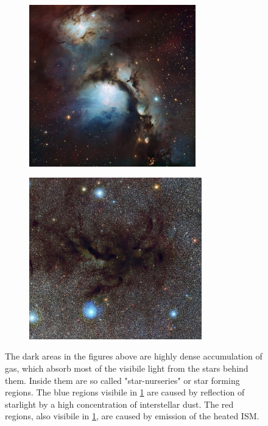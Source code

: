 \begin{figure}[h]
	\begin{subfigure}[c]{0.45\textwidth}
		\includegraphics[height=7cm]{img/nebula-messier-78-eso1105a}
		\label{fig:messier78}
	\end{subfigure}\hfill%
	\begin{subfigure}[c]{0.45\textwidth}
		\includegraphics[height=7cm]{img/nebula-pipe-eso1233a}
	\end{subfigure}%
\caption{The dark areas in the figures above are highly dense accumulation of gas, which absorb most of the visibile light from the stars behind them. Inside them are so called "star-nurseries" or star forming regions. The blue regions visibile in \ref{fig:messier78} are caused by reflection of starlight by a high concentration of interstellar dust. The red regions, also visibile in \ref{fig:messier78}, are caused by emission of the heated ISM.}

\label{fig:nebulae}
\end{figure}


